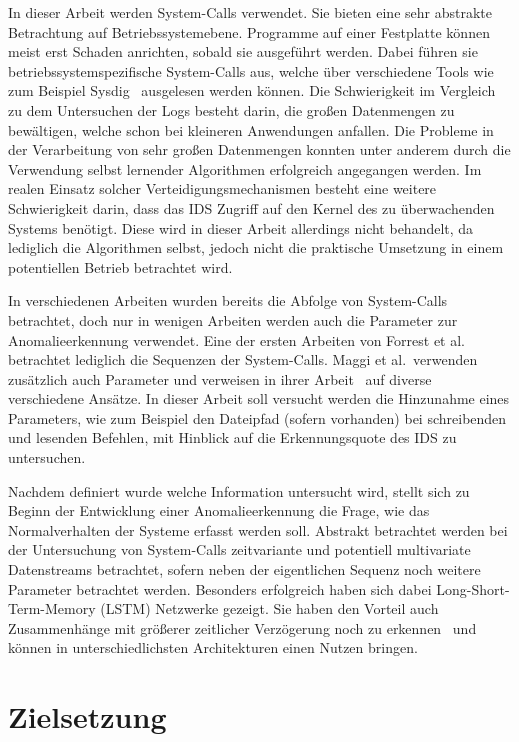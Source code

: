 In dieser Arbeit werden System-Calls verwendet.
Sie bieten eine sehr abstrakte Betrachtung auf Betriebssystemebene.
Programme auf einer Festplatte können meist erst Schaden anrichten, sobald sie ausgeführt werden.
Dabei führen sie betriebssystemspezifische System-Calls aus, welche über verschiedene Tools wie zum Beispiel Sysdig~\cite{SYSDIG} ausgelesen werden können.
Die Schwierigkeit im Vergleich zu dem Untersuchen der Logs besteht darin, die großen Datenmengen zu bewältigen, welche schon bei kleineren Anwendungen anfallen.
Die Probleme in der Verarbeitung von sehr großen Datenmengen konnten unter anderem durch die Verwendung selbst lernender Algorithmen erfolgreich angegangen werden.
Im realen Einsatz solcher Verteidigungsmechanismen besteht eine weitere Schwierigkeit darin, dass das \ac{IDS} Zugriff auf den Kernel des zu überwachenden Systems benötigt.
Diese wird in dieser Arbeit allerdings nicht behandelt, da lediglich die Algorithmen selbst, jedoch nicht die praktische Umsetzung in einem potentiellen Betrieb betrachtet wird.

In verschiedenen Arbeiten wurden bereits die Abfolge von System-Calls betrachtet, doch nur in wenigen Arbeiten werden auch die Parameter zur Anomalieerkennung verwendet. Eine der ersten Arbeiten von Forrest et al.~\cite{FORREST} betrachtet lediglich die Sequenzen der System-Calls.
Maggi et al.\ verwenden zusätzlich auch Parameter und verweisen in ihrer Arbeit~\cite{MAGGI} auf diverse verschiedene Ansätze.
In dieser Arbeit soll versucht werden die Hinzunahme eines Parameters, wie zum Beispiel den Dateipfad (sofern vorhanden) bei schreibenden und lesenden Befehlen, mit Hinblick auf die Erkennungsquote des \ac{IDS} zu untersuchen.

Nachdem definiert wurde welche Information untersucht wird, stellt sich zu Beginn der Entwicklung einer Anomalieerkennung die Frage, wie das Normalverhalten der Systeme erfasst werden soll.
Abstrakt betrachtet werden bei der Untersuchung von System-Calls zeitvariante und potentiell multivariate Datenstreams betrachtet, sofern neben der eigentlichen Sequenz noch weitere Parameter betrachtet werden.
Besonders erfolgreich haben sich dabei Long-Short-Term-Memory (LSTM) Netzwerke gezeigt.
Sie haben den Vorteil auch Zusammenhänge mit größerer zeitlicher Verzögerung noch zu erkennen~\cite{HOCHREITER} und können in unterschiedlichsten Architekturen einen Nutzen bringen. %

\section{Zielsetzung}

